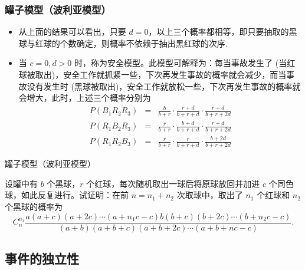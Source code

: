 \begin{frame}
	\frametitle{罐子模型（波利亚模型）}
	\begin{itemize}[<+-|alert@+>]
		\item 从上面的结果可以看出，只要 $d=0$，以上三个概率都相等，即只要抽取的黑球与红球的个数确定，则概率不依赖于抽出黑红球的次序.
		\item 当 $c=0,d>0$ 时，称为安全模型。此模型可解释为：每当事故发生了 (当红球被取出)，安全工作就抓紧一些，下次再发生事故的概率就会减少，而当事故没有发生时 (黑球被取出)，安全工作就放松一些，下次再发生事故的概率就会增大，此时，上述三个概率分别为
		{\small\begin{eqnarray*}
				P(B_1R_2R_3) &=&\frac{b}{b+r}\cdot\frac{r+d}{b+r+d}\cdot\frac{r+d}{b+r+2d}\\
				P(R_1B_2R_3)&=&\frac{r}{b+r}\cdot\frac{b+d}{b+r+d}\cdot\frac{r+d}{b+r+2d}\\
				P(R_1R_2B_3) &=&\frac{r}{b+r}\cdot\frac{r}{b+r+d}\cdot\frac{b+2d}{b+r+2d}
		\end{eqnarray*}}
	\end{itemize}

\end{frame}

\begin{frame}{罐子模型（波利亚模型）}
	\begin{exam}
	设罐中有 $b$ 个黑球，$r$ 个红球，每次随机取出一球后将原球放回并加进 $c$ 个同色球，如此反复进行。试证明：在前 $n=n_1+n_2$ 次取球中，取出了 $n_1$ 个红球和 $n_2$ 个黑球的概率为
		$$C_n^{n_1}\frac{a(a+c)(a+2c)\cdots(a+n_1c-c)b(b+c)(b+2c)\cdots(b+n_2c-c)}{(a+b)(a+b+c)(a+b+2c)\cdots(a+b+nc-c)}.$$
	\end{exam}
\end{frame}
\subsection{事件的独立性}

